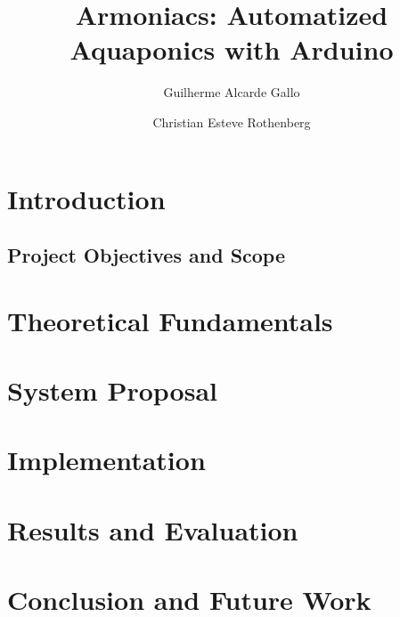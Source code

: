 \documentclass[10pt,a4paper]{article}
\title{Armoniacs: Automatized Aquaponics with Arduino}
\author{Guilherme Alcarde Gallo \and Christian Esteve Rothenberg 
}
\begin{document}
\maketitle

\newpage

\tableofcontents

\newpage

\section{Introduction}
\label{sec:introduction}


\subsection{Project Objectives and Scope}
\label{objectives}


\section{Theoretical Fundamentals}
\label{fundamentals}


\section{System Proposal}
\label{proposal}


\section{Implementation}
\label{implementation}


\section{Results and Evaluation}
\label{evaluation}


\section{Conclusion and Future Work}
\label{conclusion}



% 


% 



\nocite{useCaseStyle}
\printbibliography
\end{document}
